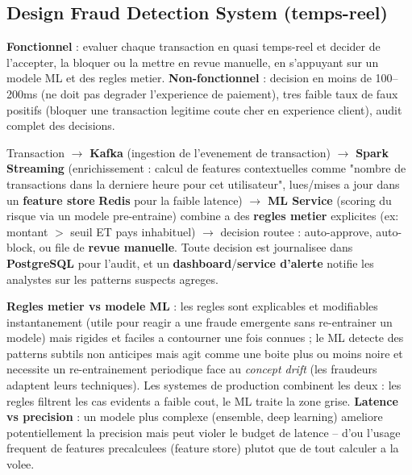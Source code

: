 \documentclass[11pt,a4paper]{article}
\newenvironment{sujet}[1]{%
  \subsection{#1}
}{%
  \bigskip
}
\begin{document}
\begin{sujet}{Design Fraud Detection System (temps-reel)}

\begin{req}
\textbf{Fonctionnel} : evaluer chaque transaction en quasi temps-reel et decider de l'accepter, la bloquer ou la mettre en revue manuelle, en s'appuyant sur un modele ML et des regles metier. \textbf{Non-fonctionnel} : decision en moins de 100--200ms (ne doit pas degrader l'experience de paiement), tres faible taux de faux positifs (bloquer une transaction legitime coute cher en experience client), audit complet des decisions.
\end{req}

\begin{archbox}
Transaction $\to$ \textbf{Kafka} (ingestion de l'evenement de transaction) $\to$ \textbf{Spark Streaming} (enrichissement : calcul de features contextuelles comme "nombre de transactions dans la derniere heure pour cet utilisateur", lues/mises a jour dans un \textbf{feature store} \textbf{Redis} pour la faible latence) $\to$ \textbf{ML Service} (scoring du risque via un modele pre-entraine) combine a des \textbf{regles metier} explicites (ex: montant $>$ seuil ET pays inhabituel) $\to$ decision routee : auto-approve, auto-block, ou file de \textbf{revue manuelle}. Toute decision est journalisee dans \textbf{PostgreSQL} pour l'audit, et un \textbf{dashboard}/\textbf{service d'alerte} notifie les analystes sur les patterns suspects agreges.
\end{archbox}

\begin{tradeoff}
\textbf{Regles metier vs modele ML} : les regles sont explicables et modifiables instantanement (utile pour reagir a une fraude emergente sans re-entrainer un modele) mais rigides et faciles a contourner une fois connues ; le ML detecte des patterns subtils non anticipes mais agit comme une boite plus ou moins noire et necessite un re-entrainement periodique face au \emph{concept drift} (les fraudeurs adaptent leurs techniques). Les systemes de production combinent les deux : les regles filtrent les cas evidents a faible cout, le ML traite la zone grise. \textbf{Latence vs precision} : un modele plus complexe (ensemble, deep learning) ameliore potentiellement la precision mais peut violer le budget de latence -- d'ou l'usage frequent de features precalculees (feature store) plutot que de tout calculer a la volee.
\end{tradeoff}

\end{sujet}
\end{document}
